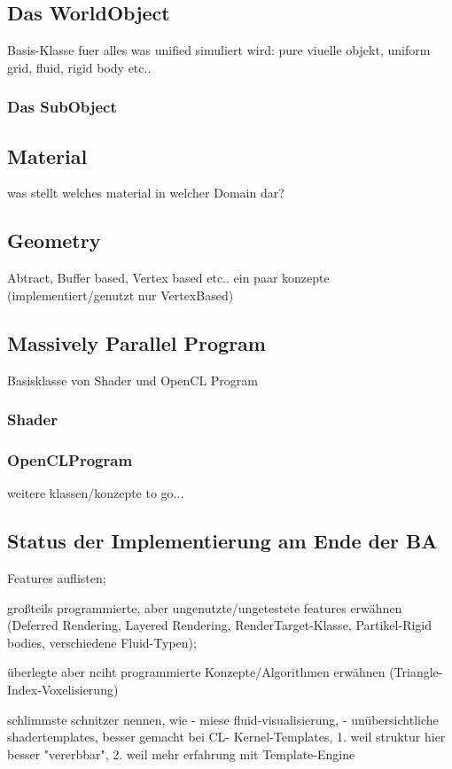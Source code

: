 \subsection{Das WorldObject}
	Basis-Klasse fuer alles was unified simuliert wird: pure viuelle objekt, uniform grid, fluid, rigid body etc..
	
	\subsubsection{Das SubObject}
  
 
\subsection{Material}  
	was stellt welches material in welcher Domain dar?
	
\subsection{Geometry}
	Abtract, Buffer based, Vertex based etc.. ein paar konzepte (implementiert/genutzt nur VertexBased)  
	
\subsection{Massively Parallel Program}
	Basisklasse von Shader und OpenCL Program
	\subsubsection{Shader}
		
	\subsubsection{OpenCLProgram}

weitere klassen/konzepte to go...	


\subsection{Status der Implementierung am Ende der BA}
	
	Features auflisten;

	großteils programmierte, aber ungenutzte/ungetestete features erwähnen (Deferred Rendering, Layered Rendering, 	
	RenderTarget-Klasse, Partikel-Rigid bodies, verschiedene Fluid-Typen); 


	überlegte aber nciht programmierte Konzepte/Algorithmen erwähnen (Triangle-Index-Voxelisierung)
	
	schlimmste schnitzer nennen, wie
		- miese fluid-visualisierung, 
		- unübersichtliche shadertemplates, besser gemacht bei CL-
			Kernel-Templates, 1. weil struktur hier besser "vererbbar", 2. weil mehr erfahrung mit  Template-Engine
	
	  	
  	

\clearpage
